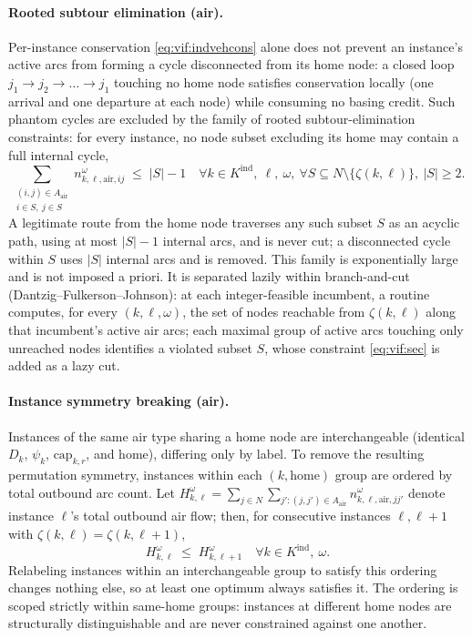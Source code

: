 \paragraph{Rooted subtour elimination (air).}
Per-instance conservation \eqref{eq:vif:indvehcons} alone does not prevent an
instance's active arcs from forming a cycle disconnected from its home node: a
closed loop $j_1 \to j_2 \to \dots \to j_1$ touching no home node satisfies
conservation locally (one arrival and one departure at each node) while
consuming no basing credit. Such phantom cycles are excluded by the family of
rooted subtour-elimination constraints: for every instance, no node subset
excluding its home may contain a full internal cycle,
\begin{equation}
\sum_{\substack{(i,j)\in A_{\text{air}}\\ i \in S,\ j \in S}}
  n^\omega_{k,\ell,\text{air},ij}
\;\leq\; |S| - 1
\quad
\forall k \in K^{\mathrm{ind}},\ \ell,\ \omega,\
\forall S \subseteq N \setminus \{\zeta(k,\ell)\},\ |S| \geq 2.
\label{eq:vif:sec}
\end{equation}
A legitimate route from the home node traverses any such subset $S$ as an
acyclic path, using at most $|S|-1$ internal arcs, and is never cut; a
disconnected cycle within $S$ uses $|S|$ internal arcs and is removed. This
family is exponentially large and is not imposed a priori. It is separated
lazily within branch-and-cut (Dantzig--Fulkerson--Johnson): at each
integer-feasible incumbent, a routine computes, for every $(k,\ell,\omega)$,
the set of nodes reachable from $\zeta(k,\ell)$ along that incumbent's active
air arcs; each maximal group of active arcs touching only unreached nodes
identifies a violated subset $S$, whose constraint \eqref{eq:vif:sec} is added
as a lazy cut.

\paragraph{Instance symmetry breaking (air).}
Instances of the same air type sharing a home node are interchangeable
(identical $D_k$, $\psi_k$, $\text{cap}_{k,r}$, and home), differing only by
label. To remove the resulting permutation symmetry, instances within each
$(k, \text{home})$ group are ordered by total outbound arc count. Let
$H^\omega_{k,\ell} = \sum_{j\in N}\sum_{j':(j,j')\in A_{\text{air}}}
n^\omega_{k,\ell,\text{air},jj'}$ denote instance $\ell$'s total outbound air
flow; then, for consecutive instances $\ell, \ell+1$ with
$\zeta(k,\ell) = \zeta(k,\ell+1)$,
\begin{equation}
H^\omega_{k,\ell} \;\leq\; H^\omega_{k,\ell+1}
\quad \forall k \in K^{\mathrm{ind}},\ \omega .
\label{eq:vif:symbreak}
\end{equation}
Relabeling instances within an interchangeable group to satisfy this ordering
changes nothing else, so at least one optimum always satisfies it. The
ordering is scoped strictly within same-home groups: instances at different
home nodes are structurally distinguishable and are never constrained against
one another.

